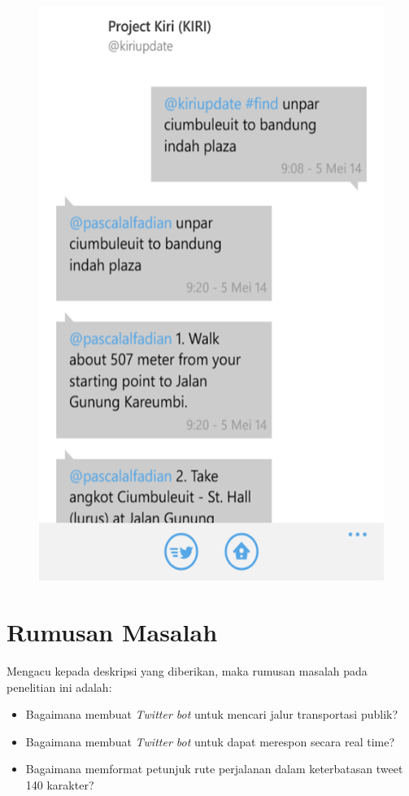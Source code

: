 \begin{figure}
	\centering
		\includegraphics{Gambar/contohpercakapan}
	\label{fig:contohpercakapan}
\end{figure}

\section{Rumusan Masalah}
Mengacu kepada deskripsi yang diberikan, maka rumusan masalah pada penelitian ini adalah:
\begin{itemize}
	\item Bagaimana membuat \textit{Twitter bot} untuk mencari jalur transportasi publik?
	\item Bagaimana membuat \textit{Twitter bot} untuk dapat merespon secara real time?
	\item Bagaimana memformat petunjuk rute perjalanan dalam keterbatasan tweet 140 karakter?
\end{itemize}

